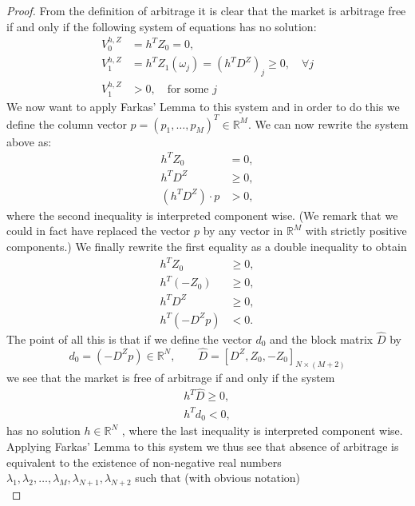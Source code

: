 \begin{proof}
    From the definition of arbitrage it is clear that the market is arbitrage free if and only if the following system of equations has no solution:
    \begin{align*}
        V_0^{h,Z} &= h^TZ_0 = 0, \\
        V_1^{h,Z} &= h^TZ_1(\omega_j)=(h^TD^Z)_j \ge0, \quad\forall j \\
        V_1^{h,Z} &>0, \quad\mbox{for some } j 
    \end{align*}
    We now want to apply Farkas’ Lemma to this system and in order to do this we define the column vector $p=(p_1,\dots,p_M)^T\in\mathbb{R}^M$. We can now rewrite the system above as:
    \begin{align*}
        h^TZ_0 &= 0,\\
        h^TD^Z &\ge 0, \\
        (h^TD^Z)\cdot p &> 0,
    \end{align*}
    where the second inequality is interpreted component wise. (We remark that we could in fact have replaced the vector $p$ by any vector in $\mathbb{R}^M$ with strictly positive components.) We finally rewrite the first equality as a double inequality to obtain
    \begin{align*}
        h^TZ_0 &\ge 0,\\
        h^T(-Z_0) &\ge 0, \\
        h^TD^Z &\ge 0, \\
        h^T(-D^Zp) & < 0.
    \end{align*}
    The point of all this is that if we define the vector $d_0$ and the block matrix $\hat{D}$ by 
    \begin{equation*}
        d_0=(-D^Zp)\in\mathbb{R}^N, \qquad \hat{D}=[D^Z,Z_0,-Z_0]_{N\times (M+2)}
    \end{equation*}
    we see that the market is free of arbitrage if and only if the system
    \begin{align*}
        h^T\hat{D} \ge 0,\\
        h^Td_0 < 0,
    \end{align*}
    has no solution $h\in\mathbb{R}^N$ , where the last inequality is interpreted component wise. Applying Farkas’ Lemma to this system we thus see that absence of arbitrage is equivalent to the existence of non-negative real numbers $\lambda_1, \lambda_2,\dots,\lambda_M, \lambda_{N+1}, \lambda_{N+2}$ such that (with obvious notation)
    \begin{equation*}

\end{equation*}
\end{proof}
